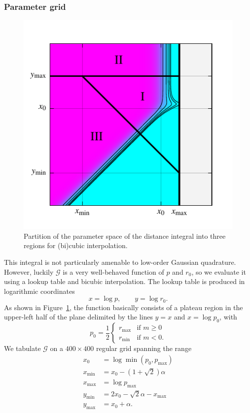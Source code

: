 \documentclass[amsmath,amssymb,aps,prx,reprint,nopreprintnumbers,nofootinbib]{revtex4-1}
\begin{document}
\subsubsection{Parameter grid}

\begin{figure}
    \includegraphics{radial_integral_interpolant}
    \caption{\label{fig:radial-integral-interpolant}Partition of the parameter space of the distance integral into three regions for (bi)cubic interpolation.}
\end{figure}

This integral is not particularly amenable to low-order Gaussian quadrature. However, luckily $\mathscr{G}$ is a very well-behaved function of $p$ and $r_0$, so we evaluate it using a lookup table and bicubic interpolation. The lookup table is produced in logarithmic coordinates
%
\begin{equation}
    x = \log p, \qquad y = \log r_0.
\end{equation}
%
As shown in Figure~\ref{fig:radial-integral-interpolant}, the function basically consists of a plateau region in the upper-left half of the plane delimited by the lines $y = x$ and $x = \log p_0$, with
%
\begin{equation}
    p_0 = \frac{1}{2}
    \begin{cases}
        r_\mathrm{max} & \text{if } m \geq 0 \\
        r_\mathrm{min} & \text{if } m < 0.
    \end{cases}
\end{equation}
%
We tabulate $\mathscr{G}$ on a $400 \times 400$ regular grid spanning the range
%
\begin{align}
    x_0 &= \log \min(p_0, p_\mathrm{max}) \\
    x_\mathrm{min} &= x_0 - (1 + \sqrt{2}) \alpha \\
    x_\mathrm{max} &= \log p_\mathrm{max} \\
    y_\mathrm{min} &= 2 x_0 - \sqrt{2} \alpha - x_\mathrm{max} \\
    y_\mathrm{max} &= x_0 + \alpha.
\end{align}
\end{document}
